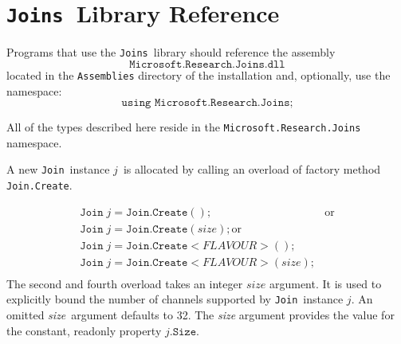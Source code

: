 \documentclass{article}
\newcommand{\joins}{{\texttt{Joins}}}
\newcommand{\cjoin}{{\texttt{Join}}}
\newcommand{\methodref}[1]{{\texttt{#1}}}
\newcommand{\dotsize}{\texttt{.Size}}
\newcommand{\joindotcreate}{\texttt{Join.Create}}
\newcommand{\joinobj}{\ensuremath{j}}
\begin{document}


\section{\joins\ Library Reference}
\label{joinsref}

Programs that use the \joins\ library should reference the assembly
\[ \texttt{Microsoft.Research.Joins.dll} \]
located in the \texttt{Assemblies} directory of the installation and, optionally, use the namespace:
\[ \texttt{using Microsoft.Research.Joins;} \]

All of the types described here reside in the \texttt{Microsoft.Research.Joins} namespace.

A new \cjoin\ instance \joinobj\ is allocated by calling an overload of factory method \methodref{Join.Create}. 

\[ 
\begin{array}{lr}
  \cjoin\; \joinobj = \joindotcreate(); & \mbox{or} \\ 
  \cjoin\; \joinobj = \joindotcreate(\textit{size});\mbox{or}\\
  \cjoin\; \joinobj = \joindotcreate<\textit{FLAVOUR}>(); &  \\ 
  \cjoin\; \joinobj = \joindotcreate<\textit{FLAVOUR}>(\textit{size});\\
\end{array}
\]
\noindent The second and fourth overload takes an integer $\textit{size}$ argument. It is used to explicitly bound the number of channels supported by 
\cjoin\ instance \joinobj. An omitted \textit{size}\ argument defaults to 32. 
The \textit{size} argument provides the value for the constant, readonly property $\joinobj\dotsize$.
\end{document}
